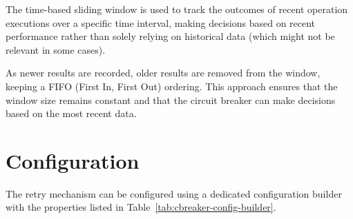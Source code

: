 The time-based sliding window is used
to track the outcomes of recent operation executions over a specific time interval,
making decisions based on recent performance rather than solely relying on historical data
(which might not be relevant in some cases).

As newer results are recorded, older results are removed from the window, keeping a FIFO (First In, First Out) ordering.
This approach ensures that the window size remains constant and that the circuit breaker can make decisions based on the most recent data.


\section{Configuration}\label{sec:cbreaker-configuration}

The retry mechanism can be configured
using a dedicated configuration builder with the properties listed in Table~\ref{tab:cbreaker-config-builder}.

